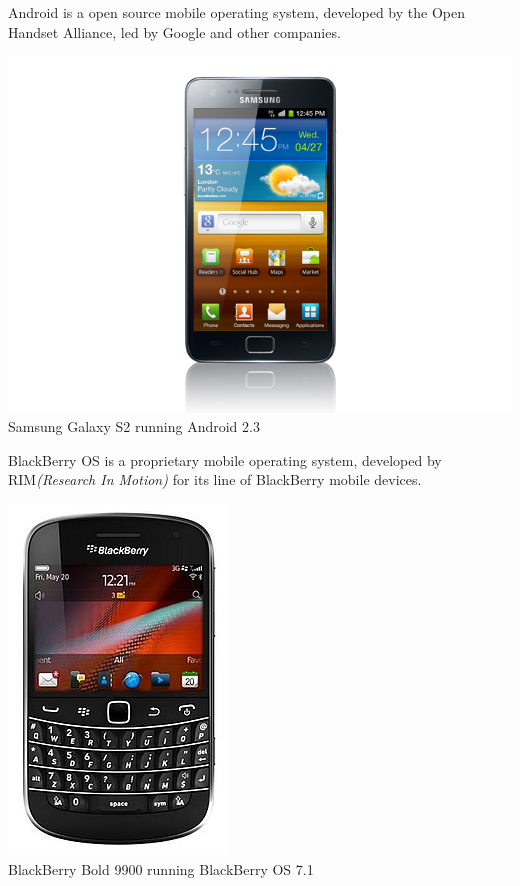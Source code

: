 Android is a open source mobile operating system, developed by the Open Handset Alliance, led by Google and other companies.\cite{Inc.2012}

\begin{centering}
\includegraphics[scale=0.35]{images/android_sgs2.jpg}\\{Samsung Galaxy S2 running Android 2.3}\\
\end{centering}


BlackBerry OS is a proprietary mobile operating system, developed by RIM\emph{(Research In Motion)} for its line of BlackBerry mobile devices.

\begin{centering}
\includegraphics[scale=0.5]{images/Blackberrybold9900.jpg}\\{BlackBerry Bold 9900 running BlackBerry OS 7.1}\\
\end{centering}



